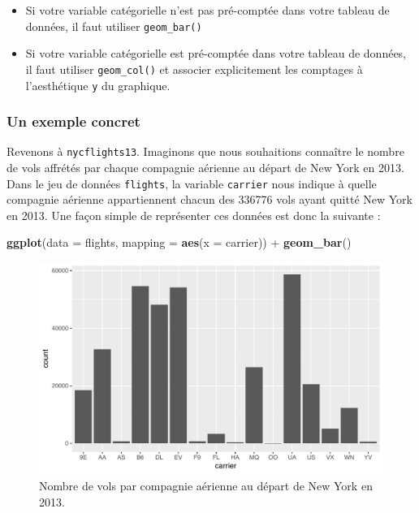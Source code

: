 \documentclass[a4paperpaper,]{article}
\newenvironment{Shaded}{\begin{snugshade}}{\end{snugshade}}
\newcommand{\DataTypeTok}[1]{\textcolor[rgb]{0.00,0.34,0.68}{#1}}
\newcommand{\KeywordTok}[1]{\textcolor[rgb]{0.12,0.11,0.11}{\textbf{#1}}}
\newcommand{\NormalTok}[1]{\textcolor[rgb]{0.12,0.11,0.11}{#1}}
\newcommand{\OperatorTok}[1]{\textcolor[rgb]{0.12,0.11,0.11}{#1}}
\newcommand{\StringTok}[1]{\textcolor[rgb]{0.75,0.01,0.01}{#1}}
\providecommand{\tightlist}{%
  \setlength{\itemsep}{0pt}\setlength{\parskip}{0pt}}
\begin{document}
\begin{itemize}
\tightlist
\item
  Si votre variable catégorielle n'est pas pré-comptée dans votre tableau de données, il faut utiliser \texttt{geom\_bar()}
\item
  Si votre variable catégorielle est pré-comptée dans votre tableau de données, il faut utiliser \texttt{geom\_col()} et associer explicitement les comptages à l'aesthétique \texttt{y} du graphique.
\end{itemize}

\hypertarget{un-exemple-concret}{%
\subsubsection{Un exemple concret}\label{un-exemple-concret}}

Revenons à \texttt{nycflights13}. Imaginons que nous souhaitions connaître le nombre de vols affrétés par chaque compagnie aérienne au départ de New York en 2013. Dans le jeu de données \texttt{flights}, la variable \texttt{carrier} nous indique à quelle compagnie aérienne appartiennent chacun des 336776 vols ayant quitté New York en 2013. Une façon simple de représenter ces données est donc la suivante :

\begin{Shaded}
\begin{Highlighting}[]
\KeywordTok{ggplot}\NormalTok{(}\DataTypeTok{data =}\NormalTok{ flights, }\DataTypeTok{mapping =} \KeywordTok{aes}\NormalTok{(}\DataTypeTok{x =}\NormalTok{ carrier)) }\OperatorTok{+}
\StringTok{  }\KeywordTok{geom_bar}\NormalTok{()}
\end{Highlighting}
\end{Shaded}

\begin{figure}[htpb]

{\centering \includegraphics[width=0.9\linewidth]{figure/bpcarrier-1} 

}

\caption{Nombre de vols par compagnie aérienne au départ de New York en 2013.}\label{fig:bpcarrier}
\end{figure}
\end{document}
